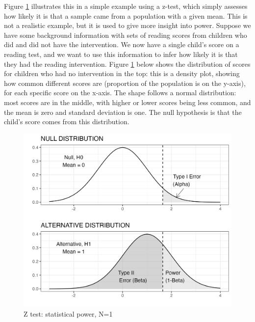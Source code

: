 \documentclass{krantz}
\begin{document}
Figure \ref{fig:densplot} illustrates this in a simple example using a z-test, which simply assesses how likely it is that a sample came from a population with a given mean. This is not a realistic example, but it is used to give more insight into power. Suppose we have some background information with sets of reading scores from children who did and did not have the intervention. We now have a single child's score on a reading test, and we want to use this information to infer how likely it is that they had the reading intervention. Figure \ref{fig:densplot} below shows the distribution of scores for children who had no intervention in the top: this is a density plot, showing how common different scores are (proportion of the population is on the y-axis), for each specific score on the x-axis. The shape follows a normal distribution: most scores are in the middle, with higher or lower scores being less common, and the mean is zero and standard deviation is one. The null hypothesis is that the child's score comes from this distribution.

\begin{figure}
\includegraphics[width=0.75\linewidth]{images_bw/densplot1} \caption{Z test: statistical power, N=1}\label{fig:densplot}
\end{figure}
\end{document}
